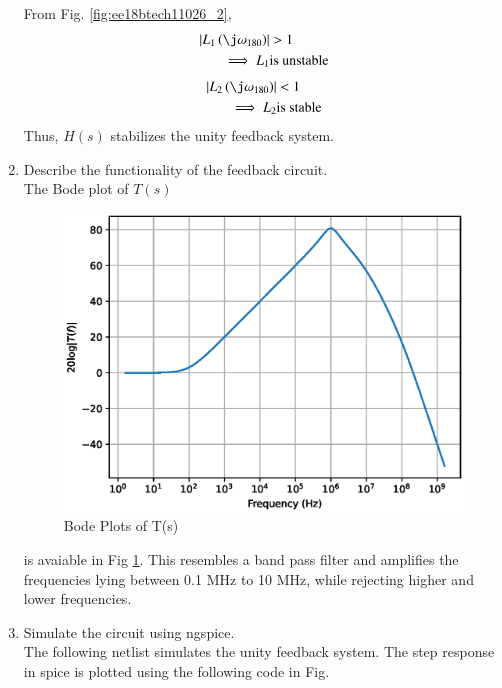 \begin{enumerate}[label=\arabic*.,ref=\theenumi]
From Fig. \ref{fig:ee18btech11026_2},
\begin{align}
\abs{L_1\brak{\j\omega_{180}}} &> 1 
\\
\implies L_{1} &\text{is unstable}
\end{align}
\begin{align}
\abs{L_2\brak{\j\omega_{180}}} & < 1 
\\
\implies L_{2} &\text{is stable}
\end{align}
%
Thus, $H(s)$ stabilizes the unity feedback system.
\item Describe the functionality of the feedback circuit.
\\
\solution
The Bode plot of $T(s)$
\begin{figure}[!h]
    \centering
    \includegraphics[width=\columnwidth]{./figs/ee18btech11026/Bodeplot.eps}
    \caption{Bode Plots of T(s)}
    \label{fig:ee18btech11026_bode}
\end{figure}
is avaiable in  Fig \ref{fig:ee18btech11026_bode}. This resembles a band pass filter and amplifies the frequencies lying between 0.1 MHz to 10 MHz, while rejecting higher and lower frequencies.
%
\item Simulate the circuit using ngspice.
%
\\
\solution 
The following netlist simulates the unity feedback system.  The step response in spice is plotted using the following code in Fig. 


\end{enumerate}
